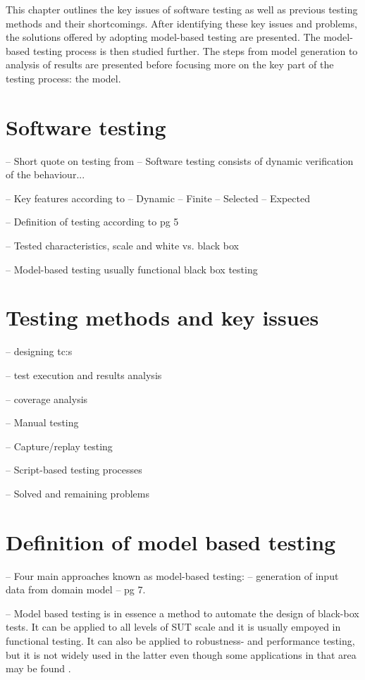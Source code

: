 This chapter outlines the key issues of software testing as well as previous testing methods and their shortcomings.
After identifying these key issues and problems, the solutions offered by adopting model-based testing are presented.
The model-based testing process is then studied further. The steps from model generation to analysis of results are presented 
before focusing more on the key part of the testing process: the model. 

\section{Software testing}
 -- Short quote on testing from \cite{swebok}
 	-- Software testing consists of dynamic verification of the behaviour...
 	
 -- Key features according to \cite{tools}
 	-- Dynamic 
 	-- Finite
 	-- Selected
 	-- Expected
 	
 -- Definition of testing according to \cite{tools} pg 5
 
 -- Tested characteristics, scale and white vs. black box
 
 -- Model-based testing usually functional black box testing

\section{Testing methods and key issues}
-- designing tc:s

-- test execution and results analysis

-- coverage analysis

-- Manual testing

-- Capture/replay testing

-- Script-based testing processes

-- Solved and remaining problems

\section{Definition of model based testing}
-- Four main approaches known as model-based testing:
	-- generation of input data from domain model
	-- \cite{tools} pg 7.
	
-- Model based testing is in essence a method to automate the design of black-box tests. It can be applied to all levels of SUT scale and it is usually empoyed in functional testing. It can also be applied to robustness- and performance testing, but it is not widely used in the latter even though some applications in that area may be found \cite{tools}.
	

